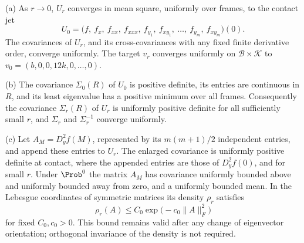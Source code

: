 \begin{lemma}\label{lem:parent-contact}
\textup{(a)} As $r\to0$, $U_r$ converges in mean square, uniformly over frames, to the contact jet
\begin{equation}\label{eq:parent-U0}
U_0=\bigl(f,\ f_x,\ f_{xx},\ f_{xxx},\ f_{y_1},\ f_{xy_1},\ \dots,\ f_{y_m},\ f_{xy_m}\bigr)(0).
\end{equation}
The covariances of $U_r$, and its cross-covariances with any fixed finite derivative order, converge uniformly. The target $v_r$ converges uniformly on $\mathcal B\times\mathcal K$ to $v_0=(b,0,0,12k,0,\dots,0)$.

\textup{(b)} The covariance $\Sigma_0(R)$ of $U_0$ is positive definite, its entries are continuous in $R$, and its least eigenvalue has a positive minimum over all frames. Consequently the covariance $\Sigma_r(R)$ of $U_r$ is uniformly positive definite for all sufficiently small $r$, and $\Sigma_r$ and $\Sigma_r^{-1}$ converge uniformly.

\textup{(c)} Let $A_M=D_y^2f(M)$, represented by its $m(m+1)/2$ independent entries, and append these entries to $U_r$. The enlarged covariance is uniformly positive definite at contact, where the appended entries are those of $D_y^2f(0)$, and for small $r$. Under $\Prob^0$ the matrix $A_M$ has covariance uniformly bounded above and uniformly bounded away from zero, and a uniformly bounded mean. In the Lebesgue coordinates of symmetric matrices its density $\rho_r$ satisfies
\begin{equation}\label{eq:parent-Adens}
\rho_r(A)\le C_0\exp\bigl(-c_0\|A\|_F^2\bigr)
\end{equation}
for fixed $C_0,c_0>0$. This bound remains valid after any change of eigenvector orientation; orthogonal invariance of the density is not required.
\end{lemma}

